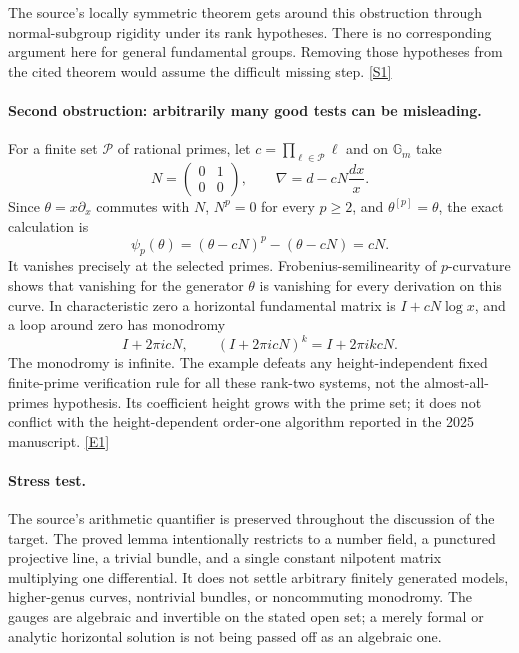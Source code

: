 \documentclass[11pt,a4paper]{article}
\newcommand{\sref}[2]{\hyperlink{source:#1:#2}{[S#2]}}
\newcommand{\eref}[2]{\hyperlink{extra:#1:#2}{[E#2]}}
\numberwithin{equation}{section}
\begin{document}
The source's locally symmetric theorem gets around this obstruction through
normal-subgroup rigidity under its rank hypotheses. There is no corresponding
argument here for general fundamental groups. Removing those hypotheses
from the cited theorem would assume the difficult missing step.
\sref{30006976}{1}

\paragraph{Second obstruction: arbitrarily many good tests can be misleading.}
For a finite set $\mathcal P$ of rational primes, let
$c=\prod_{\ell\in\mathcal P}\ell$ and on $\mathbb G_m$ take
\[
 N=\begin{pmatrix}0&1\\0&0\end{pmatrix},\qquad
 \nabla=d-cN\frac{dx}{x}.
\]
Since $\theta=x\partial_x$ commutes with $N$, $N^p=0$ for every $p\ge2$, and
$\theta^{[p]}=\theta$, the exact calculation is
\begin{equation}\label{30006976:finite-test}
 \psi_p(\theta)=(\theta-cN)^p-(\theta-cN)=cN.
\end{equation}
It vanishes precisely at the selected primes. Frobenius-semilinearity of
$p$-curvature shows that vanishing for the generator $\theta$ is vanishing
for every derivation on this curve. In characteristic zero a horizontal
fundamental matrix is $I+cN\log x$, and a loop around zero has monodromy
\[
 I+2\pi i cN,
 \qquad (I+2\pi i cN)^k=I+2\pi i k cN.
\]
The monodromy is infinite. The example defeats any height-independent fixed
finite-prime verification rule for all these rank-two systems, not the
almost-all-primes hypothesis. Its coefficient height grows with the prime
set; it does not conflict with the height-dependent order-one algorithm
reported in the 2025 manuscript. \eref{30006976}{1}

\paragraph{Stress test.}
The source's arithmetic quantifier is preserved throughout the discussion
of the target. The proved lemma intentionally restricts to a number field,
a punctured projective line, a trivial bundle, and a single constant nilpotent
matrix multiplying one differential. It does not settle arbitrary
finitely generated models, higher-genus curves, nontrivial bundles, or
noncommuting monodromy. The gauges are algebraic and invertible on the
stated open set; a merely formal or analytic horizontal solution is not
being passed off as an algebraic one.
\end{document}

